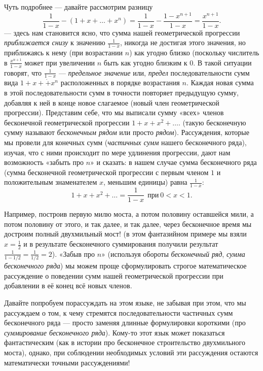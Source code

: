 \documentclass{article}
\begin{document}
Чуть подробнее --- давайте рассмотрим разницу
\[\frac1{1-x}-(1+x+\dots+x^n)=\frac1{1-x}-\frac{1-x^{n+1}}{1-x}=\frac{x^{n+1}}{1-x}.\]
--- здесь нам становится ясно, 
что сумма нашей геометрической прогрессии \emph{приближается снизу} к значению $\tfrac{1}{1-x}$, 
никогда не достигая этого значения, но приближаясь к нему (при возрастании $n$) как угодно близко 
(поскольку числитель в $\frac{x^{n+1}}{1-x}$ может при увеличении $n$ быть как угодно близким к $0$.
В такой ситуации говорят, что $\tfrac{1}{1-x}$ --- \emph{предельное значение} или, \emph{предел} 
последовательности сумм вида $1+x+\dot+x^n$ 
расположенных в порядке возрастания $n$.
Каждая новая сумма в этой последовательности сумм в точности повторяет предыдущую сумму, добавляя к ней в конце новое слагаемое (новый член геометрической прогрессии). Представим себе, что мы выписали сумму «всех» членов бесконечной геометрической прогрессии
$1+x+x^2+\dots.$
(такую бесконечную сумму называют \emph{бесконечным рядом} или просто \emph{рядом}). 
Рассуждения, которые мы провели для конечных сумм (\emph{частичных сумм} нашего бесконечного ряда), 
изучая, что с ними происходит по мере удлинения прогрессии, дают нам возможность «забыть про $n$» и сказать: в нашем случае сумма бесконечного ряда (сумма бесконечной геометрической прогрессии с первым членом $1$ и положительным знаменателем $x$, меньшим единицы) равна $\frac{1}{1-x}$:
\[1+x+x^2+\dots=\frac1{1-x}\ \ \text{при}\ 0<x<1.\]

Например, 
построив первую милю моста, 
а потом половину оставшейся мили, 
а потом половину от этого, и так далее, 
и так далее, 
через бесконечное время мы достроим полный двухмильный мост! 
(в этом фантазийном примере мы взяли $x=\tfrac12$ 
и в результате бесконечного суммирования получили результат $\tfrac1{1-1/2}=\tfrac1{1/2}=2$).
«Забыв про $n$» (используя обороты \emph{бесконечный ряд}, \emph{сумма бесконечного ряда}) мы можем проще сформулировать строгое математическое рассуждение о поведении сумм нашей геометрической прогрессии при добавлении в её конец всё новых членов. 

Давайте попробуем порассуждать на этом языке, не забывая при этом, что мы рассуждаем о том, к чему стремятся последовательности частичных сумм бесконечного ряда --- просто заменяя длинные формулировки короткими (про \emph{суммирование бесконечного ряда}). 
Кому-то этот язык может показаться фантастическим (как в истории про бесконечное строительство двухмильного моста), однако, при соблюдении необходимых условий эти рассуждения остаются математически точными рассуждениями!
\end{document}
